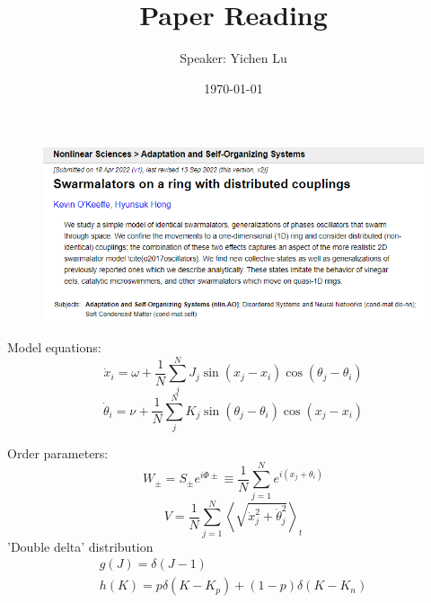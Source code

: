 \documentclass[10pt,aspectratio=43,mathserif,table]{beamer}
\title{Paper Reading}
\author{Speaker: Yichen Lu\quad \newline  \newline \quad }
\institute{\fontsize{8pt}{14pt}}
\date{\today}
\begin{document}
\begin{frame}
    \begin{figure}
        \centering
        \includegraphics[width=\textwidth]{title.png}
    \end{figure}
\end{frame}

\begin{frame}
    Model equations:
    $$
    \dot{x}_i=\omega +\frac{1}{N}\sum_j^N{J_j\sin \left( x_j-x_i \right) \cos \left( \theta _j-\theta _i \right)}
    $$
    $$
    \dot{\theta}_i=\nu +\frac{1}{N}\sum_j^N{K_j\sin \left( \theta _j-\theta _i \right) \cos \left( x_j-x_i \right)}
    $$

    Order parameters:
    $$
    W_{\pm}=S_{\pm}e^{i\Phi \pm}\equiv \frac{1}{N}\sum_{j=1}^N{e^{i\left( x_j+\theta _i \right)}}
    $$
    $$
    V=\frac{1}{N}\sum_{j=1}^N{\left< \sqrt{\dot{x}_{j}^{2}+\dot{\theta}_{j}^{2}} \right> _t}
    $$
    'Double delta' distribution
    $$
    \begin{array}{l}
        g\left( J \right) =\delta \left( J-1 \right)\\
        h\left( K \right) =p\delta \left( K-K_p \right) +\left( 1-p \right) \delta \left( K-K_n \right)\\
    \end{array}
    $$


\end{frame}
\end{document}
